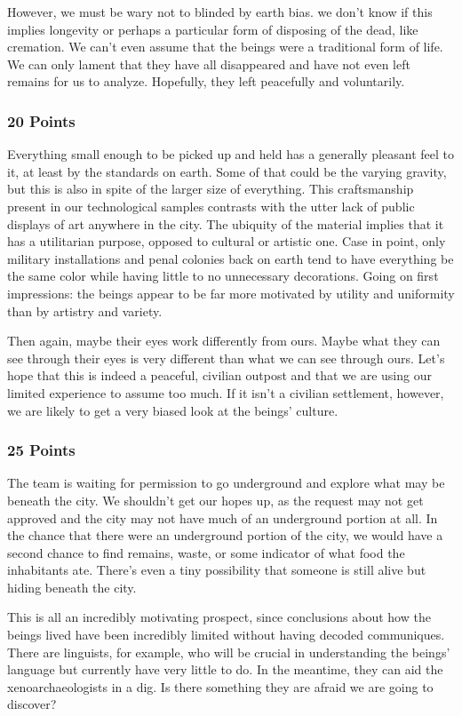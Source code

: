 \documentclass[conference]{IEEEtran}
\begin{document}
However, we must be wary not to blinded by earth bias. we don’t know if this implies longevity or perhaps a particular form of disposing of the dead, like cremation. We can’t even assume that the beings were a traditional form of life. We can only lament that they have all disappeared and have not even left remains for us to analyze. Hopefully, they left peacefully and voluntarily. 

\subsubsection*{20 Points}
Everything small enough to be picked up and held has a generally pleasant feel to it, at least by the standards on earth. Some of that could be the varying gravity, but this is also in spite of the larger size of everything. This craftsmanship present in our technological samples contrasts with the utter lack of public displays of art anywhere in the city. The ubiquity of the material implies that it has a utilitarian purpose, opposed to cultural or artistic one. Case in point, only military installations and penal colonies back on earth tend to have everything be the same color while having little to no unnecessary decorations. Going on first impressions: the beings appear to be far more motivated by utility and uniformity than by artistry and variety.

Then again, maybe their eyes work differently from ours. Maybe what they can see through their eyes is very different than what we can see through ours.  Let’s hope that this is indeed a peaceful, civilian outpost and that we are using our limited experience to assume too much. If it isn’t a civilian settlement, however, we are likely to get a very biased look at the beings’ culture. 

\subsubsection*{25 Points}
The team is waiting for permission to go underground and explore what may be beneath the city. We shouldn’t get our hopes up, as the request may not get approved and the city may not have much of an underground portion at all. In the chance that there were an underground portion of the city, we would have a second chance to find remains, waste, or some indicator of what food the inhabitants ate. There’s even a tiny possibility that someone is still alive but hiding beneath the city.

This is all an incredibly motivating prospect, since conclusions about how the beings lived have been incredibly limited without having decoded communiques. There are linguists, for example, who will be crucial in understanding the beings’ language but currently have very little to do. In the meantime, they can aid the xenoarchaeologists in a dig. Is there something they are afraid we are going to discover?
\end{document}
